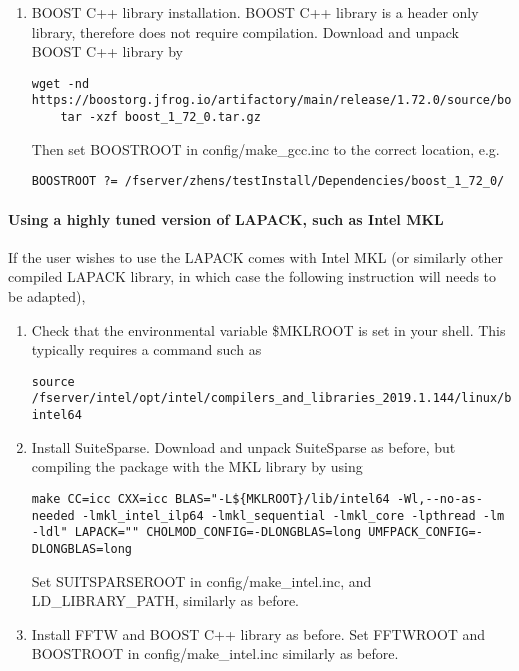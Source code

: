 \documentclass[english,11pt]{article}
\begin{document}
\begin{enumerate}
    \item BOOST C++ library installation. BOOST C++ library is a header only library, therefore does not require compilation. Download and unpack BOOST C++ library by
    \begin{lstlisting}[breaklines=true, showstringspaces=false]
    wget -nd https://boostorg.jfrog.io/artifactory/main/release/1.72.0/source/boost_1_72_0.tar.gz
    tar -xzf boost_1_72_0.tar.gz
    \end{lstlisting}
    Then set BOOSTROOT in config/make_gcc.inc to the correct location, e.g.
    \begin{lstlisting}[breaklines=true, showstringspaces=false]
    BOOSTROOT ?= /fserver/zhens/testInstall/Dependencies/boost_1_72_0/
    \end{lstlisting}
\end{enumerate}

\paragraph{Using a highly tuned version of LAPACK, such as Intel MKL}
If the user wishes to use the LAPACK comes with Intel MKL (or similarly other compiled LAPACK library, in which case the following instruction will needs to be adapted),
\begin{enumerate}
    \item Check that the environmental variable \$MKLROOT is set in your shell. This typically requires a command such as 
    \begin{lstlisting}[breaklines=true, showstringspaces=false]
    source /fserver/intel/opt/intel/compilers_and_libraries_2019.1.144/linux/bin/compilervars.sh intel64
    \end{lstlisting}
    \item Install SuiteSparse. Download and unpack SuiteSparse as before, but compiling the package with the MKL library by using
    \begin{lstlisting}[breaklines=true, showstringspaces=false]
    make CC=icc CXX=icc BLAS="-L${MKLROOT}/lib/intel64 -Wl,--no-as-needed -lmkl_intel_ilp64 -lmkl_sequential -lmkl_core -lpthread -lm -ldl" LAPACK="" CHOLMOD_CONFIG=-DLONGBLAS=long UMFPACK_CONFIG=-DLONGBLAS=long
    \end{lstlisting}
    Set SUITSPARSEROOT in config/make_intel.inc, and LD_LIBRARY_PATH, similarly as before. 
    
    \item Install FFTW and BOOST C++ library as before. Set FFTWROOT and BOOSTROOT in config/make_intel.inc similarly as before.
\end{enumerate}
\end{document}
